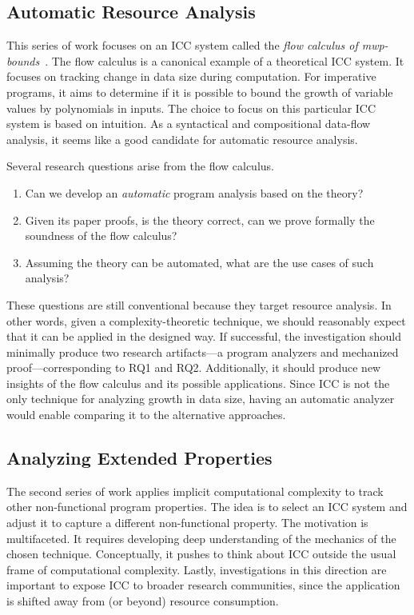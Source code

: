 \subsection{Automatic Resource Analysis}
\label{subsec:aicc-automatic-resource-analysis}

This series of work focuses on an ICC system called the \emph{flow calculus of
mwp-bounds}~\cite{jones2009}. The flow calculus is a canonical example of a
theoretical ICC system. It focuses on tracking change in data size during
computation. For imperative programs, it aims to determine if it is possible to
bound the growth of variable values by polynomials in inputs. The choice to
focus on this particular ICC system is based on intuition. As a syntactical and
compositional data-flow analysis, it {seems like} a good candidate for automatic
resource analysis.

Several research questions arise from the flow calculus.

\begin{enumerate}[label={(RQ\arabic*)},leftmargin=*,labelindent=1em]
\item Can we develop an \emph{automatic} program analysis based on the theory?
\item Given its paper proofs, is the theory correct, \ie can we prove formally
the soundness of the flow calculus?
\item Assuming the theory can be automated, what are the use cases of such
analysis?
\end{enumerate}

These questions are still conventional because they target resource analysis. In
other words, given a complexity-theoretic technique, we should reasonably expect
that it can be applied in the designed way. If successful, the investigation
should minimally produce two research artifacts---a program analyzers and
mechanized proof---corresponding to RQ1 and RQ2. Additionally, it should produce
new insights of the flow calculus and its possible applications. Since ICC is
not the only technique for analyzing growth in data size, having an automatic
analyzer would enable comparing it to the alternative approaches.

\subsection{Analyzing Extended Properties}
\label{subsec:extended-props}

The second series of work applies implicit computational complexity to track
{other} non-functional program properties. The idea is to select an ICC system
and adjust it to capture a different non-functional property. The motivation is
multifaceted. It requires developing deep understanding of the mechanics of the
chosen technique. Conceptually, it pushes to think about ICC outside the usual
frame of computational complexity. Lastly, investigations in this direction are
important to expose ICC to broader research communities, since the application
is shifted away from (or beyond) resource consumption.

